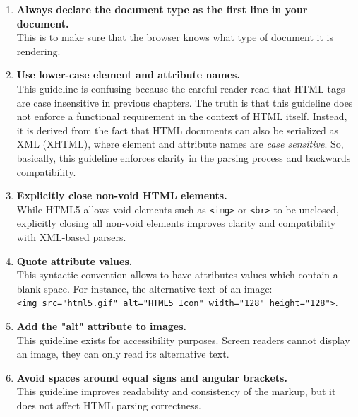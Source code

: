 \documentclass{scrbook}
\begin{document}
\begin{enumerate}
    \item 
    \parbox[t]{\linewidth}{
        \textbf{Always declare the document type as the first line in your document.} \\
        This is to make sure that the browser knows what type of document it is rendering.
    }

    \item 
    \parbox[t]{\linewidth}{
        \textbf{Use lower-case element and attribute names.} \\
        This guideline is confusing because the careful reader read that HTML tags are case insensitive in previous chapters. The truth is that this guideline does not enforce a functional requirement in the context of HTML itself. Instead, it is derived from the fact that HTML documents can also be serialized as XML (XHTML), where element and attribute names are \textit{case sensitive}. So, basically, this guideline enforces clarity in the parsing process and backwards compatibility.
    }

    \item 
    \parbox[t]{\linewidth}{
        \textbf{Explicitly close non-void HTML elements.} \\
        While HTML5 allows void elements such as \texttt{<img>} or \texttt{<br>} to be unclosed, explicitly closing all non-void elements improves clarity and compatibility with XML-based parsers.
    }

    \item 
    \parbox[t]{\linewidth}{
        \textbf{Quote attribute values.} \\
        This syntactic convention allows to have attributes values which contain a blank space. For instance, the alternative text of an image: \\
        \texttt{<img src="html5.gif" alt="HTML5 Icon" width="128" height="128">}.
    }

    \item 
    \parbox[t]{\linewidth}{
        \textbf{Add the "alt" attribute to images.} \\
        This guideline exists for accessibility purposes. Screen readers cannot display an image, they can only read its alternative text.
    }

    \item 
    \parbox[t]{\linewidth}{
        \textbf{Avoid spaces around equal signs and angular brackets.} \\
        This guideline improves readability and consistency of the markup, but it does not affect HTML parsing correctness.
    }


\end{enumerate}
\end{document}
